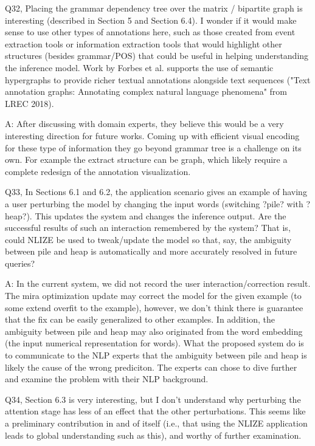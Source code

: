 Q32, Placing the grammar dependency tree over the matrix / bipartite graph is interesting (described in Section 5 and Section 6.4). I wonder if it would make sense to use other types of annotations here, such as those created from event extraction tools or information extraction tools that would highlight other structures (besides grammar/POS) that could be useful in helping understanding the inference model. Work by Forbes et al. supports the use of semantic hypergraphs to provide richer textual annotations alongside text sequences ("Text annotation graphs: Annotating complex natural language phenomena" from LREC 2018).

A: After discussing with domain experts, they believe this would be a very interesting direction for future works. Coming up with efficient visual encoding for these type of information they go beyond grammar tree is a challenge on its own. For example the extract structure can be graph, which likely require a complete redesign of the annotation visualization.

Q33, In Sections 6.1 and 6.2, the application scenario gives an example of having a user perturbing the model by changing the input words (switching ?pile? with ?heap?). This updates the system and changes the inference output. Are the successful results of such an interaction remembered by the system? That is, could NLIZE be used to tweak/update the model so that, say, the ambiguity between pile and heap is automatically and more accurately resolved in future queries?

A: In the current system, we did not record the user interaction/correction result. The mira optimization update may correct the model for the given example (to some extend overfit to the example), however, we don't think there is guarantee that the fix can be easily generalized to other examples. In addition, the ambiguity between pile and heap may also originated from the word embedding (the input numerical representation for words). What the proposed system do is to communicate to the NLP experts that the ambiguity between pile and heap is likely the cause of the wrong prediciton. The experts can chose to dive further and examine the problem with their NLP background.

Q34, Section 6.3 is very interesting, but I don't understand why perturbing the attention stage has less of an effect that the other perturbations. This seems like a preliminary contribution in and of itself (i.e., that using the NLIZE application leads to global understanding such as this), and worthy of further examination.

